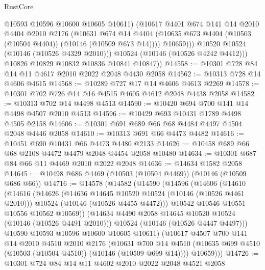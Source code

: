 \begin{lexlean}{RustCore}
\begin{coremodule}
                  @10593
                  @10596
                  @10600
                  @10605
                  @10611)
                (@10617
                  @4401
                  @674
                  @141
                  @14
                  @2010
                  @4404
                  @2010
                  @2176
                  (@10631
                    @674
                    @14
                    @4404
                    (@10635 @673 @4404 (@10503 (@10504 @4404)) (@10146 (@10509 @673 @14))))
                  @10659)))
            @10520
            @10524
            (@10146 (@10526 @4329 @2010)))
          @10524
          (@10146 (@10526 @4242 @4412)))
        @10826
        @10829
        @10832
        @10836
        @10841
        @10847))
@14558 := @10301 @728 @84 @14 @11 @4617 @2010 @2022 @2048 @4430 @2058
@14562 := @10313 @728 @14 @4606 @4615
@14568 := @10289 @727 @17 @14 @4606 @4613 @2269
@14578 := @10301 @702 @726 @14 @16 @4515 @4605 @4612 @2048 @4438 @2058
@14582 := @10313 @702 @14 @4498 @4513
@14590 := @10420 @694 @700 @141 @14 @4498 @4507 @2010 @4513
@14596 := @10429 @693 @10431 @1789 @4498 @4505 @2158
@14606 := @10301 @691 @689 @66 @68 @4484 @4497 @4504 @2048 @4446 @2058
@14610 := @10313 @691 @66 @4473 @4482
@14616 := @10451 @690 @10431 @66 @4473 @4480 @2133
@14626 := @10458 @689 @66 @68 @2108 @4472 @4479 @2048 @4454 @2058 @10480
@14634 := @10301 @687 @84 @66 @11 @4469 @2010 @2022 @2048
@14636 := @14634 @1582 @2058
@14645 := @10498 @686 @4469 (@10503 (@10504 @4469)) (@10146 (@10509 @686 @66))
@14716 := @14578
    (@14582
      (@14590
        (@14596
          (@14606
            (@14610
              (@14616
                (@14626
                  (@14636 @14645 @10520 @10524 (@10146 (@10526 @4461 @2010)))
                  @10524
                  (@10146 (@10526 @4455 @4472)))
                @10542
                @10546
                @10551
                @10556
                @10562
                @10569))
            (@14634 @4490 @2058 @14645 @10520 @10524 (@10146 (@10526 @4491 @2010)))
            @10524
            (@10146 (@10526 @4447 @4497)))
          @10590
          @10593
          @10596
          @10600
          @10605
          @10611)
        (@10617
          @4507
          @700
          @141
          @14
          @2010
          @4510
          @2010
          @2176
          (@10631
            @700
            @14
            @4510
            (@10635 @699 @4510 (@10503 (@10504 @4510)) (@10146 (@10509 @699 @14))))
          @10659)))
@14726 := @10301 @724 @84 @14 @11 @4602 @2010 @2022 @2048 @4521 @2058

\end{coremodule}
\end{lexlean}
